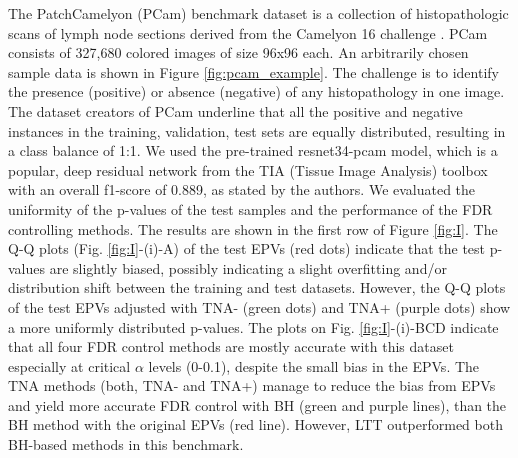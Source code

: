 \documentclass{article}
\begin{document}
The PatchCamelyon (PCam) benchmark dataset is a collection of histopathologic scans of lymph node sections \cite{Veeling2018-qh} derived from the Camelyon 16 challenge \cite{camelyon16}. PCam consists of 327,680 colored images of size 96x96 each. An arbitrarily chosen sample data is shown in Figure \ref{fig:pcam_example}. The challenge is to identify the presence (positive) or absence (negative) of any histopathology in one image. The dataset creators of PCam underline that all the positive and negative instances in the training, validation, test sets are equally distributed, resulting in a class balance of 1:1. We used the pre-trained resnet34-pcam model, which is a popular, deep residual network from the TIA (Tissue Image Analysis) toolbox \cite{Pocock2022} with an overall f1-score of 0.889, as stated by the authors. We evaluated the uniformity of the p-values of the test samples and the performance of the FDR controlling methods. The results are shown in the first row of Figure \ref{fig:I}.  The Q-Q plots (Fig. \ref{fig:I}-(i)-A) of the test EPVs (red dots) indicate that the test p-values are slightly biased, possibly indicating a slight overfitting and/or distribution shift between the training and test datasets. However, the Q-Q plots of the test  EPVs adjusted with TNA- (green dots) and TNA+ (purple dots) show a more uniformly distributed p-values. The plots on Fig. \ref{fig:I}-(i)-BCD indicate that all four FDR control methods are mostly accurate with this dataset especially at critical $\alpha$ levels (0-0.1), despite the small bias in the EPVs. The TNA methods (both, TNA- and TNA+) manage to reduce the bias from EPVs and yield more accurate FDR control with BH (green and purple lines), than the BH method with the original EPVs (red line). However, LTT outperformed both BH-based methods in this benchmark. 
\end{document}
